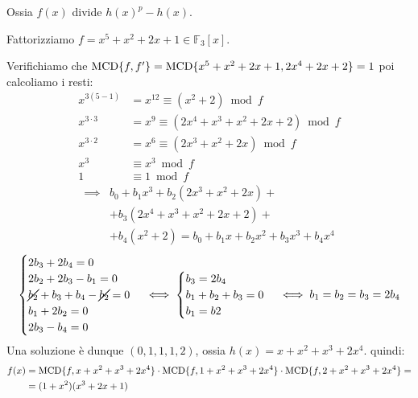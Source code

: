 \documentclass[../main.tex]{subfiles}
\begin{document}
Ossia $f(x)$ divide $h(x)^p - h(x)$.
\begin{example}
    Fattorizziamo $f = x^5 + x^2 + 2x + 1 \in \mathbb{F}_3[x]$.

    Verifichiamo che $\operatorname{MCD}\{f, f'\} = \operatorname{MCD}\{ x^5 + x^2 + 2x + 1, 2x^4 + 2x + 2\} = 1$ poi calcoliamo i resti:
    \begin{align*}
        x^{3(5-1)}    & = x^{12} \equiv (x^2 + 2) \bmod f                \\
        x^{3\cdot3}   & = x^9 \equiv (2x^4 + x^3 + x^2 + 2x + 2) \bmod f \\
        x^{3 \cdot 2} & = x^6 \equiv (2x^3 + x^2 + 2x) \bmod f           \\
        x^3           & \equiv x^3 \bmod f                               \\
        1             & \equiv 1 \bmod f
    \end{align*}
    \begin{align*}
        \implies & b_0 + b_1 x^3 + b_2(2x^3 + x^2 + 2x) +                    \\
                 & + b_3 (2x^4 + x^3 + x^2 + 2x + 2) +                       \\
                 & + b_4(x^2 + 2) = b_0 + b_1 x + b_2x^2 + b_3 x^3 + b_4 x^4
    \end{align*}
    \begin{equation*}
        \begin{cases}
            2 b_3 + 2 b_4 = 0                           \\
            2 b_2 + 2 b_3 - b_1 = 0                     \\
            \cancel{b_2} + b_3 + b_4 - \cancel{b_2} = 0 \\
            b_1 + 2 b_2 = 0                             \\
            2 b_3 - b_4 = 0
        \end{cases}
        \iff
        \begin{cases}
            b_3 = 2 b_4         \\
            b_1 + b_2 + b_3 = 0 \\
            b_1 = b2
        \end{cases}
        \iff
        b_1 = b_2 = b_3 = 2 b_4
    \end{equation*}
    Una soluzione è dunque $(0, 1, 1, 1, 2)$, ossia $h(x) =x + x^2 + x^3 +2 x^4$. quindi:
    \begin{align*}
        f(x) & = \operatorname{MCD}\{f, x + x^2 + x^3 +2 x^4\} \cdot \operatorname{MCD}\{f, 1 + x^2 + x^3 +2 x^4\} \cdot \operatorname{MCD}\{f, 2 + x^2 + x^3 + 2x^4\} = \\
             & = (1 + x^2)(x^3 + 2x + 1)
    \end{align*}
\end{example}
\end{document}
